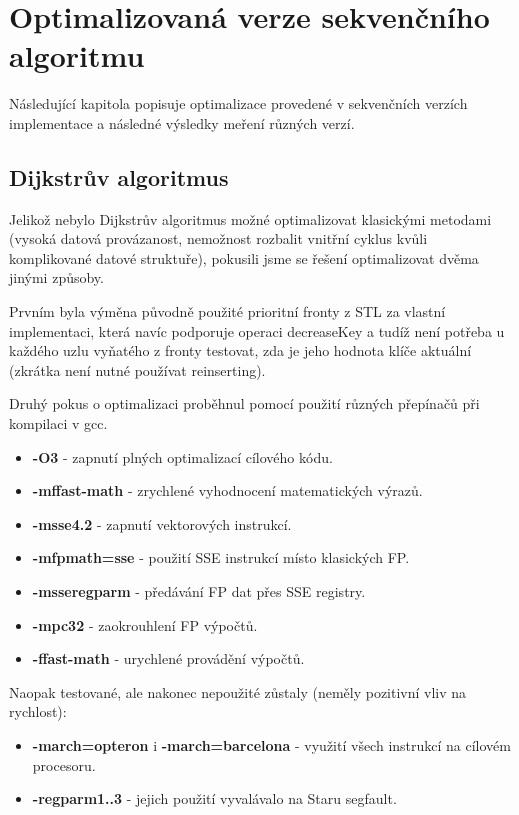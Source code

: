 \documentclass[a4paper,11pt]{article}
\begin{document}
\section{Optimalizovaná verze sekvenčního algoritmu}
Následující kapitola popisuje optimalizace provedené v sekvenčních verzích implementace a následné výsledky meření různých verzí.

\subsection{Dijkstrův algoritmus}
Jelikož nebylo Dijkstrův algoritmus možné optimalizovat klasickými metodami (vysoká datová provázanost, nemožnost rozbalit vnitřní cyklus kvůli komplikované datové struktuře), pokusili jsme se řešení optimalizovat dvěma jinými způsoby. 
\par

Prvním byla výměna původně použité prioritní fronty z STL za vlastní implementaci, která navíc podporuje operaci decreaseKey a tudíž není po\-třeba u každého uzlu vyňatého z fronty testovat, zda je jeho hodnota klíče aktuální (zkrátka není nutné používat reinserting).
\par
Druhý pokus o optimalizaci proběhnul pomocí použití různých přepínačů při kompilaci v gcc.
\begin{itemize}
 \item \textbf{-O3} - zapnutí plných optimalizací cílového kódu.
 \item \textbf{-mffast-math} - zrychlené vyhodnocení matematických výrazů.
 \item \textbf{-msse4.2} - zapnutí vektorových instrukcí.
 \item \textbf{-mfpmath=sse} - použití SSE instrukcí místo klasických FP.
 \item \textbf{-msseregparm} - předávání FP dat přes SSE registry.
 \item \textbf{-mpc32} - zaokrouhlení FP výpočtů.
 \item \textbf{-ffast-math} - urychlené provádění výpočtů.
\end{itemize}
 Naopak testované, ale nakonec nepoužité zůstaly (neměly pozitivní vliv na rychlost): 
\begin{itemize}
 \item \textbf{-march=opteron} i \textbf{-march=barcelona}  - využití všech instrukcí na cílovém procesoru.
 \item \textbf{-regparm1..3} - jejich použití vyvalávalo na Staru segfault.
\end{itemize}
\end{document}
